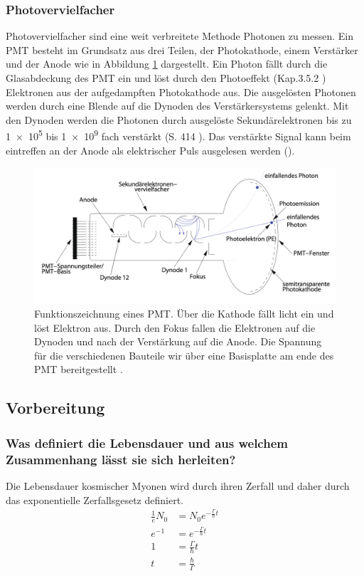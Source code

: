 \subsubsection{Photovervielfacher}
\label{sec:pmt}
Photovervielfacher sind eine weit verbreitete Methode Photonen zu messen.
Ein PMT besteht im Grundsatz aus drei Teilen, der Photokathode, einem Verstärker und der Anode wie in Abbildung \ref{fig:pmt} dargestellt.
Ein Photon fällt durch die Glasabdeckung des PMT ein und löst durch den Photoeffekt (Kap.3.5.2 \cite{source2}) Elektronen aus der aufgedampften Photokathode aus.
Die ausgelösten Photonen werden durch eine Blende auf die Dynoden des Verstärkersystems gelenkt.
Mit den Dynoden werden die Photonen durch ausgelöste Sekundärelektronen bis zu \num{1e5} bis \num{1e9} fach verstärkt (S. \num{414} \cite{source2}).
Das verstärkte Signal kann beim eintreffen an der Anode als elektrischer Puls ausgelesen werden (\cite{source2}).
\begin{figure}[ht]
    \centering
    \includegraphics[width = \textwidth]{./bilder/PMT.png}
    \caption{Funktionszeichnung eines PMT. Über die Kathode fällt licht ein und löst Elektron aus. Durch den Fokus fallen die Elektronen auf die Dynoden und nach der Verstärkung auf die Anode. Die Spannung für die verschiedenen Bauteile wir über eine Basisplatte am ende des PMT bereitgestellt \cite{Schmidt2002Aufbau}.}
    \label{fig:pmt}
\end{figure}

\subsection{Vorbereitung}
\subsubsection{Was definiert die Lebensdauer und aus welchem Zusammenhang lässt sie sich herleiten?}
Die Lebensdauer kosmischer Myonen wird durch ihren Zerfall und daher durch das exponentielle Zerfallsgesetz definiert.
\begin{align*}
    \frac{1}{e} N_0 &= N_0 e^{-\frac{\Gamma}{\hbar} t}\\
    e^{-1} &= e^{-\frac{\Gamma}{\hbar} t}\\
    1 &= \frac{\Gamma}{\hbar} t \\
    t &= \frac{\hbar}{\Gamma}
\end{align*}
